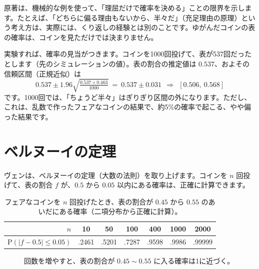 \documentclass[a4paper,11pt,openany]{ltjsbook}
\newcommand{\Prob}{\mathrm{P}}
\begin{document}
原著は、機械的な例を使って、「理屈だけで確率を決める」ことの限界を示します。たとえば、「どちらに偏る理由もないから、半々だ」（充足理由の原理）という考え方は、実際には、くり返しの経験とは別のことです。ゆがんだコインの表の確率は、コインを見ただけでは決まりません。

実験すれば、確率の見当がつきます。コインを1000回投げて、表が537回だったとします（先のシミュレーションの値）。表の割合の推定値は $0.537$、およその信頼区間（正規近似）は
\[
0.537\pm1.96\sqrt{\tfrac{0.537\times0.463}{1000}}\ =\ 0.537\pm0.031\ \ \Rightarrow\ \ [0.506,\ 0.568]
\]
です。1000回では、「ちょうど半々」はぎりぎり区間の外になります。ただし、これは、乱数で作ったフェアなコインの結果で、約5\%の確率で起こる、やや偏った結果です。

\section{ベルヌーイの定理}

ヴェンは、ベルヌーイの定理（大数の法則）を取り上げます。コインを $n$ 回投げて、表の割合 $f$ が、$0.5$ から $0.05$ 以内にある確率は、正確に計算できます。

\begin{table}[htbp]
\centering
\begin{tabular}{r|cccccc}
\toprule
$n$ & 10 & 50 & 100 & 400 & 1000 & 2000\\
\midrule
$\Prob(|f-0.5|\le0.05)$ & .2461 & .5201 & .7287 & .9598 & .9986 & .99999\\
\bottomrule
\end{tabular}
\caption{フェアなコインを $n$ 回投げたとき、表の割合が $0.45$ から $0.55$ のあいだにある確率（二項分布から正確に計算）。}
\end{table}

\begin{figure}[htbp]
\centering
{}
\caption{回数を増やすと、表の割合が $0.45\sim0.55$ に入る確率は1に近づく。}
\end{figure}
\end{document}
